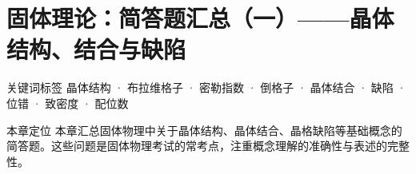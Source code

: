 \section{固体理论：简答题汇总（一）——晶体结构、结合与缺陷}
\label{sec:solid-state-short-1}

\begin{tipbox}{关键词标签}
晶体结构 · 布拉维格子 · 密勒指数 · 倒格子 · 晶体结合 · 缺陷 · 位错 · 致密度 · 配位数
\end{tipbox}

\begin{insightbox}{本章定位}
本章汇总固体物理中关于晶体结构、晶体结合、晶格缺陷等基础概念的简答题。这些问题是固体物理考试的常考点，注重概念理解的准确性与表述的完整性。
\end{insightbox}

\vspace{0.5em}

